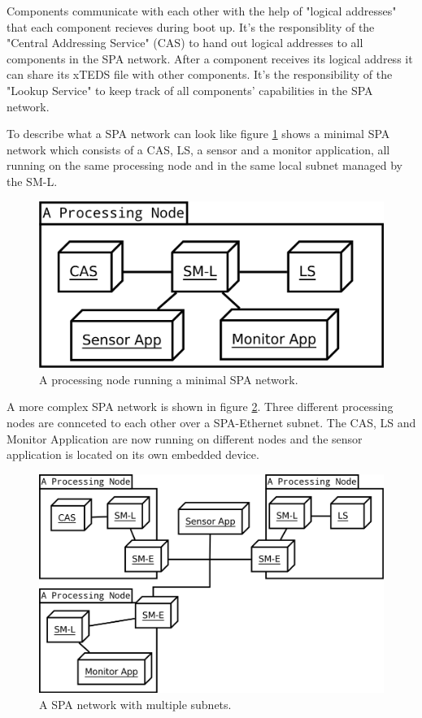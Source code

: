 Components communicate with each other with the help of "logical addresses"
that each component recieves during boot up. It's the responsiblity of the
"Central Addressing Service" (CAS) to hand out logical addresses to all
components in the SPA network. After a component receives its logical address
it can share its xTEDS file with other components. It's the responsibility of
the "Lookup Service" to keep track of all components' capabilities in the SPA
network.

To describe what a SPA network can look like figure
\ref{fig:minimal_spa_network} shows a minimal SPA network which consists of a
CAS, LS, a sensor and a monitor application, all running on the same processing
node and in the same local subnet managed by the SM-L.

\begin{figure}[h]
    \centering
    \includegraphics[width=\textwidth]{figures/minimal_spa_network}
    \caption{A processing node running a minimal SPA network.}
    \label{fig:minimal_spa_network}
\end{figure}

A more complex SPA network is shown in figure \ref{fig:complex_spa_network}.
Three different processing nodes are connceted to each other over a
SPA-Ethernet subnet. The CAS, LS and Monitor Application are now running on
different nodes and the sensor application is located on its own embedded
device.

\begin{figure}[h]
    \centering
    \includegraphics[width=\textwidth]{figures/complex_spa_network}
    \caption{A SPA network with multiple subnets.}
    \label{fig:complex_spa_network}
\end{figure}

